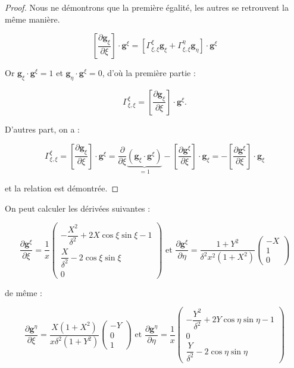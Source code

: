 \begin{proof}
Nous ne démontrons que la première égalité, les autres se retrouvent la même manière.

$$\left[ \dfrac{\partial \mathbf{g}_{\xi}}{\partial \xi} \right] \cdot \mathbf{g}^{\xi} = \left[ \Gamma_{\xi,\xi}^{\xi} \mathbf{g}_{\xi} + \Gamma_{\xi,\xi}^{\eta} \mathbf{g}_{\eta} \right] \cdot \mathbf{g}^{\xi}$$

Or $\mathbf{g}_{\xi} \cdot \mathbf{g}^{\xi} = 1$ et $\mathbf{g}_{\eta} \cdot \mathbf{g}^{\xi} = 0$, d'où la première partie :

$$\Gamma_{\xi,\xi}^{\xi} = \left[ \dfrac{\partial \mathbf{g}_{\xi}}{\partial \xi} \right] \cdot \mathbf{g}^{\xi}.$$

D'autres part, on a :

$$\Gamma_{\xi,\xi}^{\xi} = \left[ \dfrac{\partial \mathbf{g}_{\xi}}{\partial \xi} \right] \cdot \mathbf{g}^{\xi} = \dfrac{\partial}{\partial \xi}  \underbrace{\left(\mathbf{g}_{\xi} \cdot \mathbf{g}^{\xi}\right)}_{=1}  - \left[ \dfrac{\partial \mathbf{g}^{\xi}}{\partial \xi}  \right] \cdot \mathbf{g}_{\xi} = - \left[ \dfrac{\partial \mathbf{g}^{\xi}}{\partial \xi}  \right] \cdot \mathbf{g}_{\xi}$$

et la relation est démontrée.
\end{proof}

On peut calculer les dérivées suivantes :

\begin{equation}
\dfrac{\partial \mathbf{g}^{\xi}}{\partial \xi} = \dfrac{1}{x} \begin{pmatrix}
-\dfrac{X^2}{\delta^2}+2X \cos \xi \sin \xi -1 \\ \dfrac{X}{\delta^2}-2 \cos \xi \sin \xi \\ 0
\end{pmatrix}
\text{ et }
\dfrac{\partial \mathbf{g}^{\xi}}{\partial \eta} = \dfrac{1+Y^2}{\delta^2 x^2 (1+X^2)} \begin{pmatrix}
-X \\ 1 \\ 0
\end{pmatrix}
\end{equation}

de même :

\begin{equation}
\dfrac{\partial \mathbf{g}^{\eta}}{\partial \xi} = \dfrac{X(1+X^2)}{x \delta^2 (1+Y^2)} \begin{pmatrix}
-Y \\ 0 \\ 1
\end{pmatrix}
\text{ et }
\dfrac{\partial \mathbf{g}^{\eta}}{\partial \eta} = \dfrac{1}{x} \begin{pmatrix}
- \dfrac{Y^2}{\delta^2} + 2 Y \cos \eta \sin \eta -1 \\ 0 \\ \dfrac{Y}{\delta^2}- 2 \cos \eta \sin \eta
\end{pmatrix}
\end{equation}

